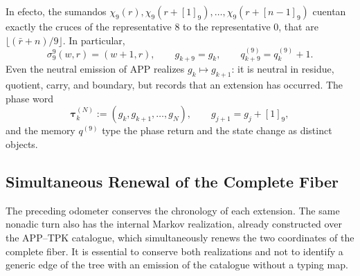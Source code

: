 In efecto, the sumandos
\(\chi_9(r),\chi_9(r+[1]_9),\ldots,\chi_9(r+[n-1]_9)\)
cuentan exactly the cruces of the representative \(8\) to the representative
\(0\), that are
\(\lfloor(\bar r+n)/9\rfloor\). In particular,
\begin{equation}
\label{eq:continuo-comun-retorno-fase-avance-memoria}
 \sigma_9^9(w,r)=(w+1,r),\qquad
 g_{k+9}=g_k,\qquad q^{(9)}_{k+9}=q^{(9)}_k+1.
\end{equation}
Even the neutral emission of APP realizes
\(g_k\mapsto g_{k+1}\): it is neutral in residue, quotient, carry, and boundary,
but records that an extension has occurred. The phase word
\begin{equation}
\label{eq:continuo-comun-palabra-fase-tpk}
 \boldsymbol\tau_k^{(N)}:=(g_k,g_{k+1},\ldots,g_N),
 \qquad g_{j+1}=g_j+[1]_9,
\end{equation}
and the memory \(q^{(9)}\) type the phase return and the
state change as distinct objects.

\subsection{Simultaneous Renewal of the Complete Fiber}
\label{sec:continuo-comun-kph}

The preceding odometer conserves the chronology of each extension. The same
nonadic turn also has the internal Markov realization, already constructed
over the APP--TPK catalogue, which simultaneously renews the two coordinates
of the complete fiber. It is essential to conserve both realizations and not to
identify a generic edge of the tree with an emission of the catalogue without
a typing map.

